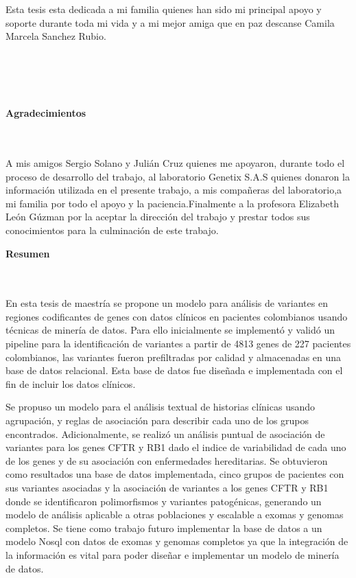 \begin{flushright}
\begin{minipage}{8cm}
    \noindent
        Esta tesis esta dedicada a mi familia quienes han sido mi principal apoyo y soporte durante toda mi vida y a mi mejor amiga que en paz descanse Camila Marcela Sanchez Rubio.\\[1.0cm]\\
      \end{minipage}
\end{flushright}

\newpage{\pagestyle{empty}\cleardoublepage}

\newpage
\thispagestyle{empty} \textbf{}\normalsize
\\\\\\%
\textbf{\LARGE Agradecimientos}
\\\\
A mis amigos Sergio Solano y Julián Cruz quienes me apoyaron, durante todo el proceso de desarrollo del trabajo, al laboratorio Genetix S.A.S quienes donaron la información utilizada en el presente trabajo, a mis compañeras del laboratorio,a mi familia por todo el apoyo y la paciencia.Finalmente a la profesora Elizabeth León Gúzman por la aceptar la dirección del trabajo y prestar todos sus conocimientos para la culminación de este trabajo. \\

\newpage{\pagestyle{empty}\cleardoublepage}

\newpage
\textbf{\LARGE Resumen}
\\\\
En esta tesis de maestría se propone un modelo para análisis de variantes en regiones codificantes de genes con datos clínicos en pacientes colombianos usando técnicas de minería de datos. Para ello inicialmente se implementó y validó un  pipeline para la identificación de variantes a partir de 4813 genes de 227 pacientes colombianos, las variantes fueron prefiltradas por calidad y almacenadas en una base de datos relacional. Esta base de datos fue diseñada e implementada con el fin de incluir los datos clínicos.

Se propuso un modelo para el análisis textual de historias clínicas usando agrupación, y reglas de asociación para describir cada uno de los grupos encontrados. Adicionalmente, se realizó un análisis puntual de asociación de variantes para los genes CFTR y RB1 dado el indice de variabilidad de cada uno de los genes y de su asociación con enfermedades hereditarias. Se obtuvieron como resultados una base de datos implementada, cinco grupos de pacientes con sus variantes asociadas y la asociación de variantes a los genes CFTR y RB1 donde se identificaron polimorfismos y variantes patogénicas, generando un modelo de análisis aplicable a otras poblaciones y escalable a exomas y genomas completos. Se tiene como trabajo futuro implementar la base de datos a un modelo Nosql con datos de exomas y genomas completos ya que la integración de la información es vital para poder diseñar e implementar un modelo de minería de datos.

